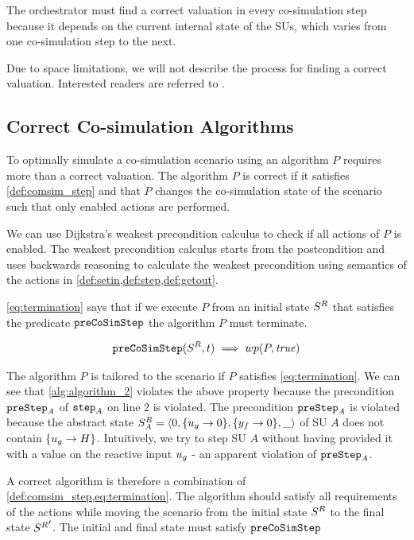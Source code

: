 The orchestrator must find a correct valuation in every co-simulation step because it depends on the current internal state of the SUs, which varies from one co-simulation step to the next.

Due to space limitations, we will not describe the process for finding a correct valuation. 
Interested readers are referred to \cite{thrane2021}.

\subsection{Correct Co-simulation Algorithms}\label{sec:correctcosim}
To optimally simulate a co-simulation scenario using an algorithm $P$ requires more than a correct valuation. 
The algorithm $P$ is correct if it satisfies \cref{def:comsim_step} and that $P$ changes the co-simulation state of the scenario such that only enabled actions are performed.

We can use Dijkstra's weakest precondition calculus \cite{dijkstra_guarded_1975} to check if all actions of $P$ is enabled.
The weakest precondition calculus starts from the postcondition and uses backwards reasoning to calculate the weakest precondition using semantics of the actions in \cref{def:setin,def:step,def:getout}.

\cref{eq:termination} says that if we execute $P$ from an initial state $S^{R}_{}$ that satisfies the predicate $\mathtt{preCoSimStep}$ the algorithm $P$ must terminate.

\begin{align}\label{eq:termination}
  \mathtt{preCoSimStep}(S^{R}_{}, t) \implies wp(P, \mathit{true})
\end{align}

The algorithm $P$ is tailored to the scenario if $P$ satisfies \cref{eq:termination}.
We can see that \cref{alg:algorithm_2} violates the above property because the precondition $\mathtt{preStep}_{A}$ of $\mathtt{step}_{A}$ on line 2 is violated.
The precondition $\mathtt{preStep}_{A}$ is violated because the abstract state $S^{R}_{A} =  \left\langle 0,\{u_{g} \to 0 \}, \{y_{f} \to 0 \}, \_ \right\rangle $ of SU $A$ does not contain $\{u_{g} \to H \}$.
Intuitively, we try to step SU $A$ without having provided it with a value on the reactive input $u_{g}$ - an apparent violation of $\mathtt{preStep}_{A}$.

A correct algorithm is therefore a combination of \cref{def:comsim_step,eq:termination}.
The algorithm should satisfy all requirements of the actions while moving the scenario from the initial state $S^{R}_{}$ to the final state ${S^{R}_{}}'$.
The initial and final state must satisfy $\mathtt{preCoSimStep}$

